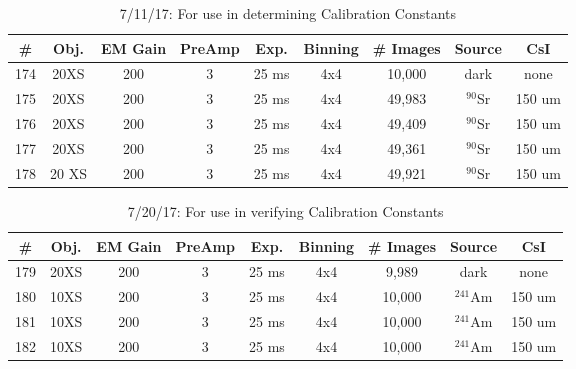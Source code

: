 \documentclass[12pt]{amsart}
\begin{document}
\begin{table}[!htbp]
	\centering
	\caption{7/11/17: For use in determining Calibration Constants}
	\label{tab:table31}
	\hspace*{-1cm}
	\begin{tabular}{ccccccccc}
	\toprule
	\# & Obj. & EM Gain & PreAmp & Exp. & Binning & \# Images & Source & CsI\\
	\midrule
	174 & 20XS & 200 & 3 & 25 ms & 4x4 & 10,000 & dark & none\\
	175 & 20XS & 200 & 3 & 25 ms & 4x4 & 49,983 & $^{90}$Sr & 150 um\\
	176 & 20XS & 200 & 3 & 25 ms & 4x4 & 49,409 & $^{90}$Sr & 150 um\\
	177 & 20XS & 200 & 3 & 25 ms & 4x4 & 49,361 & $^{90}$Sr & 150 um\\
	178 & 20 XS & 200 & 3 & 25 ms & 4x4 & 49,921 & $^{90}$Sr & 150 um\\
	\bottomrule
	\end{tabular}
	\hspace*{-1cm}
\end{table}

\begin{table}[!htbp]
	\centering
	\caption{7/20/17: For use in verifying Calibration Constants}
	\label{tab:table32}
	\hspace*{-1cm}
	\begin{tabular}{ccccccccc}
	\toprule
	\# & Obj. & EM Gain & PreAmp & Exp. & Binning & \# Images & Source & CsI\\
	\midrule
	179 & 20XS & 200 & 3 & 25 ms & 4x4 & 9,989 & dark & none\\
	180 & 10XS & 200 & 3 & 25 ms & 4x4 & 10,000 & $^{241}$Am & 150 um\\
	181 & 10XS & 200 & 3 & 25 ms & 4x4 & 10,000 & $^{241}$Am & 150 um\\
	182 & 10XS & 200 & 3 & 25 ms & 4x4 & 10,000 & $^{241}$Am & 150 um\\
	\bottomrule
	\end{tabular}
	\hspace*{-1cm}
\end{table}
\end{document}

